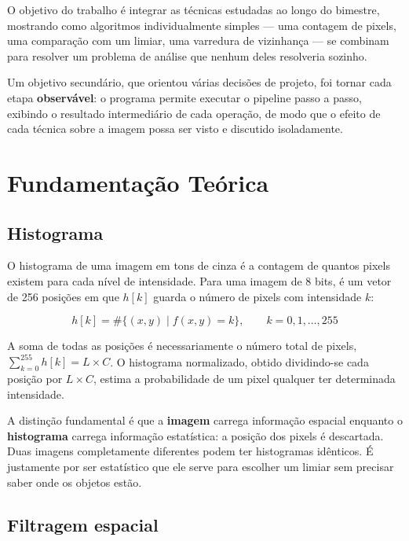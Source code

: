 \documentclass[12pt,a4paper]{article}
\begin{document}
O objetivo do trabalho é integrar as técnicas estudadas ao longo do bimestre,
mostrando como algoritmos individualmente simples --- uma contagem de pixels,
uma comparação com um limiar, uma varredura de vizinhança --- se combinam
para resolver um problema de análise que nenhum deles resolveria sozinho.

Um objetivo secundário, que orientou várias decisões de projeto, foi tornar
cada etapa \textbf{observável}: o programa permite executar o pipeline passo a
passo, exibindo o resultado intermediário de cada operação, de modo que o
efeito de cada técnica sobre a imagem possa ser visto e discutido
isoladamente.

\section{Fundamentação Teórica}

\subsection{Histograma}

O histograma de uma imagem em tons de cinza é a contagem de quantos pixels
existem para cada nível de intensidade. Para uma imagem de 8 bits, é um vetor
de 256 posições em que $h[k]$ guarda o número de pixels com intensidade $k$:

\begin{equation}
h[k] = \#\{(x,y) \mid f(x,y) = k\}, \qquad k = 0,1,\dots,255
\end{equation}

A soma de todas as posições é necessariamente o número total de pixels,
$\sum_{k=0}^{255} h[k] = L \times C$. O histograma normalizado, obtido
dividindo-se cada posição por $L \times C$, estima a probabilidade de um pixel
qualquer ter determinada intensidade.

A distinção fundamental é que a \textbf{imagem} carrega informação espacial
enquanto o \textbf{histograma} carrega informação estatística: a posição dos
pixels é descartada. Duas imagens completamente diferentes podem ter
histogramas idênticos. É justamente por ser estatístico que ele serve para
escolher um limiar sem precisar saber onde os objetos estão.

\subsection{Filtragem espacial}
\end{document}
